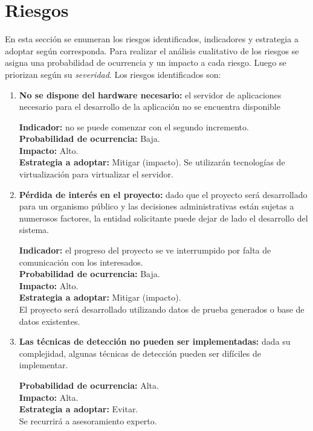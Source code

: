 \section*{Riesgos}

En esta sección se enumeran los riesgos identificados, indicadores y estrategia a adoptar según corresponda. Para realizar el análisis cualitativo de los riesgos se asigna una probabilidad de ocurrencia y un impacto a cada riesgo. Luego se priorizan según su \textit{severidad}. Los riesgos identificados son:

\begin{enumerate}
\item \textbf{No se dispone del hardware necesario:} el servidor de aplicaciones necesario para el desarrollo de la aplicación no se encuentra disponible

\textbf{Indicador:} no se puede comenzar con el segundo incremento. \\
\textbf{Probabilidad de ocurrencia:} Baja. \\
\textbf{Impacto:} Alto. \\
\textbf{Estrategia a adoptar:} Mitigar (impacto).
Se utilizarán tecnologías de virtualización para virtualizar el servidor.

\newpage

\item \textbf{Pérdida de interés en el proyecto:} dado que el proyecto será desarrollado para un organismo público y las decisiones administrativas están sujetas a numerosos factores, la entidad solicitante puede dejar de lado el desarrollo del sistema.

\textbf{Indicador:} el progreso del proyecto se ve interrumpido por falta de comunicación con los interesados. \\
\textbf{Probabilidad de ocurrencia:} Baja. \\
\textbf{Impacto:} Alto. \\
\textbf{Estrategia a adoptar:} Mitigar (impacto). \\
El proyecto será desarrollado utilizando datos de prueba generados o base de datos existentes.

\item \textbf{Las técnicas de detección no pueden ser implementadas:} dada su complejidad, algunas técnicas de detección pueden ser difíciles de implementar.

\textbf{Probabilidad de ocurrencia:} Alta. \\
\textbf{Impacto:} Alta. \\
\textbf{Estrategia a adoptar:} Evitar. \\
Se recurrirá a asesoramiento experto.

\end{enumerate}

